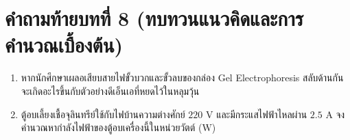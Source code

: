 \section*{คำถามท้ายบทที่ 8 (ทบทวนแนวคิดและการคำนวณเบื้องต้น)}
\begin{enumerate}
    \item หากนักศึกษาเผลอเสียบสายไฟขั้วบวกและขั้วลบของกล่อง Gel Electrophoresis สลับด้านกัน จะเกิดอะไรขึ้นกับตัวอย่างดีเอ็นเอที่หยดไว้ในหลุมวุ้น
    \item ตู้อบเลี้ยงเชื้อจุลินทรีย์ใช้กับไฟบ้านความต่างศักย์ $220\text{ V}$ และมีกระแสไฟฟ้าไหลผ่าน $2.5\text{ A}$ จงคำนวณหากำลังไฟฟ้าของตู้อบเครื่องนี้ในหน่วยวัตต์ ($\text{W}$)
\end{enumerate}
